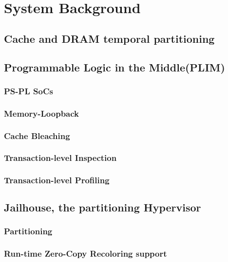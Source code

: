 \section{System Background}
    \subsection{Cache and DRAM temporal partitioning}
   
    \subsection{Programmable Logic in the Middle(PLIM)}
        \subsubsection{PS-PL SoCs}
        \subsubsection{Memory-Loopback}
        \subsubsection{Cache Bleaching}
        \subsubsection{Transaction-level Inspection}
        \subsubsection{Transaction-level Profiling}
            
    \subsection{Jailhouse, the partitioning Hypervisor}
        \subsubsection{Partitioning}
        \subsubsection{Run-time Zero-Copy Recoloring support}